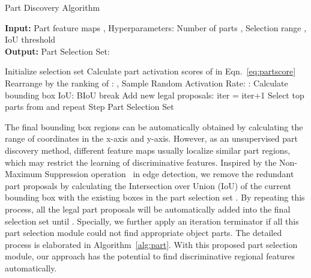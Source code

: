 \documentclass[journal]{IEEEtran}
\begin{document}
\begin{algorithm}[!t]
\caption{Part Discovery Algorithm}\label{alg:part}
\hspace*{0.02in} {\bf Input:}
Part feature maps , Hyperparameters: Number of parts , Selection range , IoU threshold \\
\hspace*{0.02in} {\bf Output:}
Part Selection Set:  
\begin{algorithmic}[1]
\State Initialize selection set 
\While{  }
    \State Calculate part activation scores  of   in Eqn.~\eqref{eq:partscore}
    \State Rearrange  by the ranking of :
    \Statex , 
    \For{ }
    \State Sample Random Activation Rate: 
    \State 
    \State :
    \For{ }
    \State Calculate bounding box IoU:
    \Statex \qquad \qquad \qquad  BIoU
    \State break
    \EndIf
    \State Add new legal proposals: 
    \EndFor
    \EndFor
    \State iter = iter+1
	\State Select top  parts from  and repeat Step 
    \EndIf
\EndWhile
\State \Return Part Selection Set 
\end{algorithmic}
\end{algorithm}



The final bounding box regions can be automatically obtained by calculating the range of coordinates in the x-axis and y-axis.
However, as an unsupervised part discovery method, different feature maps usually localize similar part regions, which may restrict the learning of discriminative features. Inspired by the Non-Maximum Suppression operation~\cite{rosenfeld1971edge} in edge detection, we remove the redundant part proposals by calculating the Intersection over Union (IoU) of the current bounding box with the existing boxes in the part selection set . By repeating this process, all the legal part proposals will be automatically added into the final selection set until . Specially, we further apply an iteration terminator if all this part selection module could not find appropriate object parts.
The detailed process is elaborated in Algorithm~\ref{alg:part}. With this proposed part selection module, our approach has the potential to find discriminative regional features automatically.
\end{document}
